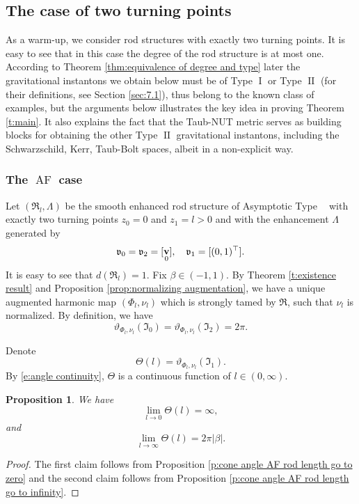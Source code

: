 \documentclass[a4paper,11pt]{amsart}
\newtheorem{proposition}[theorem]{Proposition}
\theoremstyle{definition}
\numberwithin{equation}{section}
\newcommand{\mv} {\mathfrak v}
\newcommand{\mI} {\mathfrak I}
\newcommand{\mR} {\mathfrak R}
\DeclareMathOperator{\I}{I}
\DeclareMathOperator{\II}{II}
\DeclareMathOperator{\bv}{{\bf v}}
\DeclareMathOperator{\AF}{AF}
\DeclareMathOperator{\AFa}{AF_\beta}
\begin{document}
\subsection{The case of two turning points}
As a warm-up, we consider rod structures with  exactly two turning points. It is easy to see that in this case the degree of the rod structure is at most one.  According to Theorem \ref{thm:equivalence of degree and type} later the gravitational instantons we obtain below must be of Type $\I$ or Type $\II$ (for their definitions, see Section \ref{sec:7.1}), thus belong to the known class of examples, but the arguments below illustrates the key idea in proving Theorem \ref{t:main}. It also explains the fact that the Taub-NUT metric serves as building blocks for obtaining the other Type $\II$ gravitational instantons, including the Schwarzschild, Kerr, Taub-Bolt spaces, albeit in a non-explicit way.



\subsubsection{The \texorpdfstring{$\AF$}{} case}
Let $(\mR_l, \Lambda)$ be the smooth enhanced rod structure of  Asymptotic Type  $\AFa$ with exactly two turning points $z_0=0$ and $z_1=l>0$ and with the enhancement $\Lambda$ generated by 
$$\mv_0=\mv_2=[\bv_{0}],  \quad \mv_1=[(0, 1)^{\top}].$$
It is easy to see that $d(\mR_l)=1$.
Fix $\beta\in (-1, 1)$. By Theorem \ref{t:existence result} and Proposition \ref{prop:normalizing augmentation}, we have a unique augmented harmonic map $(\Phi_l, \nu_l)$ which is strongly tamed by $\mR$, such that $\nu_l$ is normalized. By definition, we have  
$$\vartheta_{\Phi_l, \nu_l}(\mI_0)=\vartheta_{\Phi_l, \nu_l}(\mI_2)=2\pi.$$

Denote 
$$\Theta(l)=\vartheta_{\Phi_l, \nu_l}(\mI_1).$$ 
By \eqref{e:angle continuity}, $\Theta$ is a continuous function of $l\in (0,\infty)$. 

\begin{proposition}\label{p:Kerr family}
    We have $$\lim_{l\rightarrow0}\Theta(l)= \infty,$$ and $$\lim_{l\rightarrow\infty}\Theta(l)=2\pi|\beta|.$$
\end{proposition}
\begin{proof}
 

The first claim follows from Proposition \ref{p:cone angle AF rod length go to zero} and the second claim      follows from Proposition \ref{p:cone angle AF rod length go to infinity}.
\end{proof}
\end{document}

